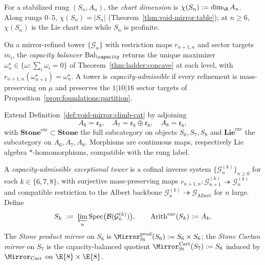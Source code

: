 \begin{definition}\label{def:ladder:chart-dim}
For a stabilized rung $(S_n,A_n)$, the \emph{chart dimension} is
$\chi(S_n):=\dim_{\R}A_n$. Along rungs $0$--$5$,
$\chi(S_n)=|S_n|$ (Theorem~\ref{thm:void-mirror:table}); at $n\geq6$,
$\chi(S_n)$ is the Lie chart size while $S_n$ is profinite.
\end{definition}

\begin{definition}\label{def:ladder:bal-capacity}
On a mirror-refined tower $\{\mathcal{G}_n\}$ with restriction maps
$r_{n+1,n}$ and sector targets $m_i$, the \emph{capacity balancer}
$\mathrm{Bal}_\capacity$ returns the unique maximizer
$\omega^\star_n\in\{\omega:\sum_i\omega_i=0\}$ of
Theorem~\ref{thm:ladder:concave} at each level, with
$r_{n+1,n}(\omega^\star_{n+1})=\omega^\star_n$. A tower is
\emph{capacity-admissible} if every refinement is mass-preserving on $\mu$ and
preserves the $1|10|16$ sector targets of
Proposition~\ref{prop:foundations:partition}.
\end{definition}

\begin{definition}\label{def:ladder:exc-climb}
Extend Definition~\ref{def:void-mirror:climb-cat} by adjoining
\[
  A_6=\mathfrak{e}_8,\quad
  A_7=\mathfrak{e}_8\oplus\mathfrak{e}_8,\quad
  A_8=\mathfrak{e}_6,
\]
with $\mathbf{Stone}^{\mathrm{exc}}\subset\mathbf{Stone}$ the full subcategory
on objects $S_6,S_7,S_8$ and
$\mathbf{Lie}^{\mathrm{exc}}$ the subcategory on $A_6,A_7,A_8$. Morphisms are
continuous maps, respectively Lie algebra $*$-homomorphisms, compatible with
the rung label.
\end{definition}

\begin{definition}\label{def:ladder:stone-lift-exc}
A \emph{capacity-admissible exceptional tower} is a cofinal inverse system
$\{\mathcal{G}_n^{(k)}\}_{n\geq0}$ for each $k\in\{6,7,8\}$, with
surjective mass-preserving maps
$r_{n+1,n}:\mathcal{G}_{n+1}^{(k)}\twoheadrightarrow\mathcal{G}_n^{(k)}$ and
compatible restriction to the Albert backbone
$\mathcal{G}_n^{(k)}\twoheadrightarrow\mathcal{G}_{\mathrm{Albert}}$ for
$n$ large. Define
\begin{equation}\label{eq:ladder:stone-exc}
  S_k\;:=\;\varprojlim_n\mathrm{Spec}\bigl(\mathcal{B}(\mathcal{G}_n^{(k)})\bigr),
  \qquad
  \mathrm{Arith}^{\mathrm{exc}}(S_k):=A_k.
\end{equation}
The \emph{Stone product mirror} on $S_6$ is
$\Mirror_{\mathrm{St}}^{\mathrm{prod}}(S_6):=S_6\times S_6$; the
\emph{Stone Cartan mirror} on $S_7$ is the capacity-balanced quotient
$\Mirror_{\mathrm{St}}^{\mathrm{Cart}}(S_7):=S_8$ induced by
$\Mirror_{\mathrm{Cart}}$ on $\E{8}\times\E{8}$.
\end{definition}

